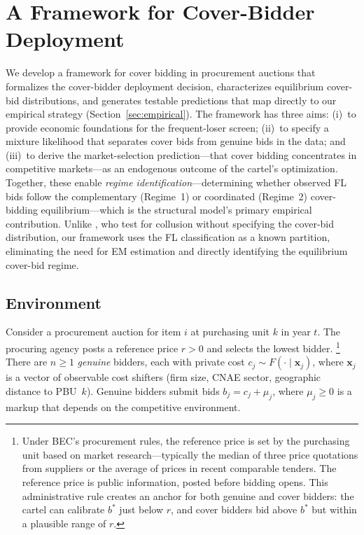 
\section{A Framework for Cover-Bidder Deployment}
\label{sec:structural}

We develop a framework for cover bidding in procurement auctions
that formalizes the cover-bidder deployment decision, characterizes
equilibrium cover-bid distributions, and generates testable predictions
that map directly to our empirical strategy
(Section~\ref{sec:empirical}). The framework has three aims: (i)~to
provide economic foundations for the frequent-loser screen; (ii)~to
specify a mixture likelihood that separates cover bids from genuine bids
in the data; and (iii)~to derive the market-selection prediction---that
cover bidding concentrates in competitive markets---as an endogenous
outcome of the cartel's optimization.
Together, these enable \emph{regime identification}---determining whether observed FL bids follow the complementary (Regime~1) or
coordinated (Regime~2) cover-bidding equilibrium---which is the
structural model's primary empirical contribution. Unlike
\citet{bajari2003deciding}, who test for collusion without specifying
the cover-bid distribution, our framework uses the FL classification as
a known partition, eliminating the need for EM estimation and directly
identifying the equilibrium cover-bid regime.


\subsection{Environment}
\label{sec:environment}

Consider a procurement auction for item $i$ at purchasing unit $k$ in
year $t$. The procuring agency posts a reference price $r > 0$ and
selects the lowest bidder.%
\footnote{Under BEC's procurement rules, the reference price is
set by the purchasing unit based on market research---typically
the median of three price quotations from suppliers or the
average of prices in recent comparable tenders. The reference
price is public information, posted before bidding opens. This
administrative rule creates an anchor for both genuine and
cover bidders: the cartel can calibrate $b^*$ just below $r$,
and cover bidders bid above $b^*$ but within a plausible range
of $r$.} There are $n \geq 1$ \emph{genuine} bidders,
each with private cost $c_j \sim F(\cdot \mid \mathbf{x}_j)$, where
$\mathbf{x}_j$ is a vector of observable cost shifters (firm size, CNAE
sector, geographic distance to PBU~$k$). Genuine bidders submit bids
$b_j = c_j + \mu_j$, where $\mu_j \geq 0$ is a markup that depends on
the competitive environment.

